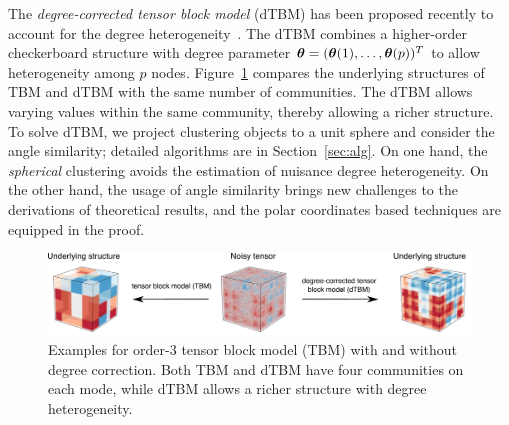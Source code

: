 \documentclass[lettersize,onecolumn,journal]{IEEEtran}
\theoremstyle{definition}
\theoremstyle{definition}
\def\fixme#1#2{\textbf{\color{red}[FIXME (#1): #2]}}
\begin{document}
The \emph{degree-corrected tensor block model} (dTBM) has been proposed recently to account for the degree heterogeneity~\citep{ke2019community}. The dTBM combines a higher-order checkerboard structure with degree parameter $\boldsymbol{\theta}=(\boldsymbol{\theta}(1),\ldots,\boldsymbol{\theta}(p))^T$ to allow heterogeneity among $p$ nodes.  Figure~\ref{fig:intro} compares the underlying structures of TBM and dTBM with the same number of communities. The dTBM allows varying values within the same community, thereby allowing a richer structure. {\color{blue} To solve dTBM, we project clustering objects to a unit sphere and consider the angle similarity; detailed algorithms are in Section~\ref{sec:alg}. On one hand, the \textit{spherical} clustering avoids the estimation of nuisance degree heterogeneity. On the other hand, the usage of angle similarity brings new challenges to the derivations of theoretical results, and the polar coordinates based techniques are equipped in the proof.
}


\begin{figure}[t]
    \centering
    \includegraphics[width = .9\textwidth]{intro2_arxiv.pdf}
    \caption{Examples for order-3 tensor block model (TBM) with and without degree correction. Both TBM and dTBM have four communities on each mode, while dTBM allows a richer structure with degree heterogeneity.
    }
    \label{fig:intro}
\end{figure}
\end{document}

